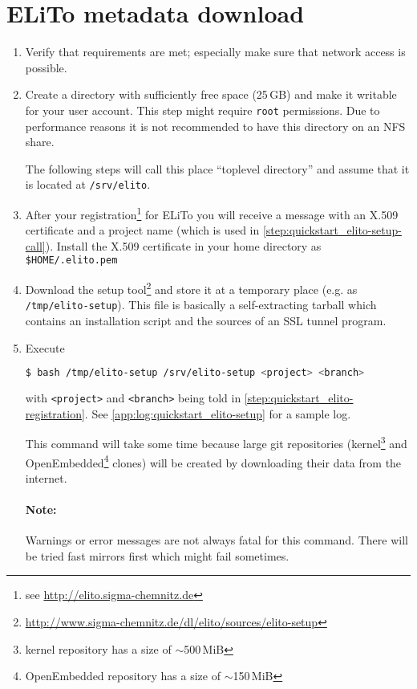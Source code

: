 \section{ELiTo metadata download}
\label{subsec:quickstart_elito-download}

\begin{enumerate}
\item Verify that requirements are met; especially make sure that
  network access is possible.
\item Create a directory with sufficiently free space (25\,GB) and make
  it writable for your user account.  This step might require
  \texttt{root} permissions.  Due to performance reasons it is not
  recommended to have this directory on an NFS share.

  The following steps will call this place ``toplevel directory''
  and assume that it is located at \texttt{/srv/elito}.
\item\label{step:quickstart_elito-registration} After your
  registration\footnote{see \url{http://elito.sigma-chemnitz.de}} for
  ELiTo you will receive a message with an X.509 certificate and a
  project name (which is used in
  \autoref{step:quickstart_elito-setup-call}).  Install the X.509
  certificate in your home directory as \texttt{\$HOME/.elito.pem}
\item Download the setup
  tool\footnote{\url{http://www.sigma-chemnitz.de/dl/elito/sources/elito-setup}}
  and store it at a temporary place (e.g. as
  \texttt{/tmp/elito-setup}).  This file is basically a
  self-extracting tarball which contains an installation script and
  the sources of an SSL tunnel program.
\item\label{step:quickstart_elito-setup-call} Execute
\begin{lstlisting}[language=bash]
$ bash /tmp/elito-setup /srv/elito-setup <project> <branch>
\end{lstlisting}%
  with \texttt{<project>} and \texttt{<branch>} being told in
  \autoref{step:quickstart_elito-registration}. See
  \autoref{app:log:quickstart_elito-setup} for a sample log.

  This command will take some time because large git repositories
  (kernel\footnote{kernel repository has a size of $\sim$500\,MiB} and
  OpenEmbedded\footnote{OpenEmbedded repository has a size of
    $\sim$150\,MiB} clones) will be created by downloading their data
  from the internet.

  \paragraph{Note:} Warnings or error messages are not always fatal for
  this command.  There will be tried fast mirrors first which might
  fail sometimes.
\end{enumerate}

